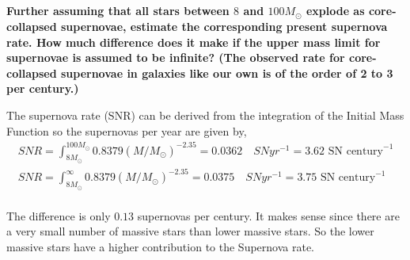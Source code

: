 \subsection{}
\textbf{Further assuming that all stars between $8$ and $100M_\odot$ explode as core-collapsed supernovae, estimate the corresponding present supernova rate. 
How much difference does it make if the upper mass limit for supernovae is assumed to be infinite? (The observed rate for
core-collapsed supernovae in galaxies like our own is of the order of 2 to 3 per century.)}

The supernova rate (SNR) can be derived from the integration of the Initial Mass Function so the supernovas per year are given by,
\begin{align*}
    SNR = \int_{8M_\odot}^{100M_\odot}0.8379(M/M_\odot)^{-2.35} = 0.0362\quad SN yr^{-1} = 3.62 \text{ SN century}^{-1}\\
    SNR = \int_{8M_\odot}^{\infty}0.8379(M/M_\odot)^{-2.35} = 0.0375\quad SN yr^{-1} = 3.75 \text{ SN century}^{-1}\\
\end{align*}

The difference is only $0.13$ supernovas per century. It makes sense since there are a very small number of massive stars than lower massive stars. So the lower massive stars have a higher contribution to the Supernova rate. 




